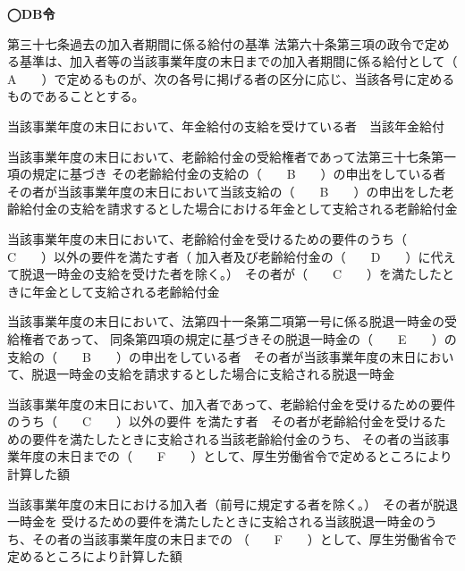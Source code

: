 \begin{fillblank}[数理人試験 H27 問題1 設問3]
  \noindent \textbf{◯DB令}
  \begin{lawstructure}
    \begin{lawarticle}{第三十七条}{過去の加入者期間に係る給付の基準}
      法第六十条第三項の政令で定める基準は、加入者等の当該事業年度の末日までの加入者期間に係る給付として（　　A　　）で定めるものが、次の各号に掲げる者の区分に応じ、当該各号に定めるものであることとする。

      当該事業年度の末日において、年金給付の支給を受けている者　当該年金給付

      当該事業年度の末日において、老齢給付金の受給権者であって法第三十七条第一項の規定に基づき
      その老齢給付金の支給の（　　B　　）の申出をしている者　その者が当該事業年度の末日において当該支給の（　　B　　）の申出をした老齢給付金の支給を請求するとした場合における年金として支給される老齢給付金

      当該事業年度の末日において、老齢給付金を受けるための要件のうち（　　C　　）以外の要件を満たす者（
      加入者及び老齢給付金の（　　D　　）に代えて脱退一時金の支給を受けた者を除く。）　その者が（　　C　　）を満たしたときに年金として支給される老齢給付金

      当該事業年度の末日において、法第四十一条第二項第一号に係る脱退一時金の受給権者であって、
      同条第四項の規定に基づきその脱退一時金の（　　E　　）の支給の（　　B　　）の申出をしている者　その者が当該事業年度の末日において、脱退一時金の支給を請求するとした場合に支給される脱退一時金

      当該事業年度の末日において、加入者であって、老齢給付金を受けるための要件のうち（　　C　　）以外の要件
      を満たす者　その者が老齢給付金を受けるための要件を満たしたときに支給される当該老齢給付金のうち、
      その者の当該事業年度の末日までの（　　F　　）として、厚生労働省令で定めるところにより計算した額


      当該事業年度の末日における加入者（前号に規定する者を除く。）　その者が脱退一時金を
      受けるための要件を満たしたときに支給される当該脱退一時金のうち、その者の当該事業年度の末日までの
      （　　F　　）として、厚生労働省令で定めるところにより計算した額

    \end{lawarticle}
  \end{lawstructure}
\end{fillblank}

